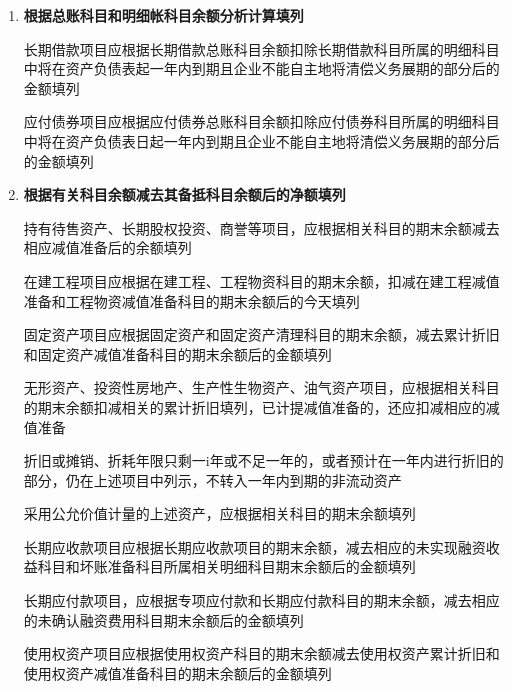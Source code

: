 \documentclass[UTF8,12pt]{ctexart}
\numberwithin{equation}{section} %
\numberwithin{figure}{section}
\numberwithin{table}{section}
\begin{document}
\begin{enumerate}
\begin{enumerate}
			在资产负债表中，企业应当根据应支付的职工薪酬负债流动性，对职工薪酬负债按照流动和非流动进行分类列报
			
			短期薪酬、离职后福利中的设定提存计划、其他长期职工福利中的符合设定提存计划条件的部分、辞退福利中将于资产负债表日后12个月内支付的部分应当在资产负债表日的流动负债项目下应付职工薪酬项目中列示
			
			辞退福利中将于资产负债表日起12个月之后支付的部分、离职后福利中设定收益计划净负债、其他长期职工福利中符合设定收益计划条件的净负债，应当在资产负债表的非流动负债项目下单独列示
		\end{enumerate}
		
		\item \textbf{根据总账科目和明细帐科目余额分析计算填列}
		
		长期借款项目应根据长期借款总账科目余额扣除长期借款科目所属的明细科目中将在资产负债表起一年内到期且企业不能自主地将清偿义务展期的部分后的金额填列
		
		应付债券项目应根据应付债券总账科目余额扣除应付债券科目所属的明细科目中将在资产负债表日起一年内到期且企业不能自主地将清偿义务展期的部分后的金额填列
		
		\item \textbf{根据有关科目余额减去其备抵科目余额后的净额填列}
		
		持有待售资产、长期股权投资、商誉等项目，应根据相关科目的期末余额减去相应减值准备后的余额填列
		
		在建工程项目应根据在建工程、工程物资科目的期末余额，扣减在建工程减值准备和工程物资减值准备科目的期末余额后的今天填列
		
		固定资产项目应根据固定资产和固定资产清理科目的期末余额，减去累计折旧和固定资产减值准备科目的期末余额后的金额填列
		
		无形资产、投资性房地产、生产性生物资产、油气资产项目，应根据相关科目的期末余额扣减相关的累计折旧填列，已计提减值准备的，还应扣减相应的减值准备
		
		折旧或摊销、折耗年限只剩一i年或不足一年的，或者预计在一年内进行折旧的部分，仍在上述项目中列示，不转入一年内到期的非流动资产
		
		采用公允价值计量的上述资产，应根据相关科目的期末余额填列
		
		长期应收款项目应根据长期应收款项目的期末余额，减去相应的未实现融资收益科目和坏账准备科目所属相关明细科目期末余额后的金额填列
		
		长期应付款项目，应根据专项应付款和长期应付款科目的期末余额，减去相应的未确认融资费用科目期末余额后的金额填列
		
		使用权资产项目应根据使用权资产科目的期末余额减去使用权资产累计折旧和使用权资产减值准备科目的期末余额后的金额填列
		

\end{enumerate}
\end{document}

